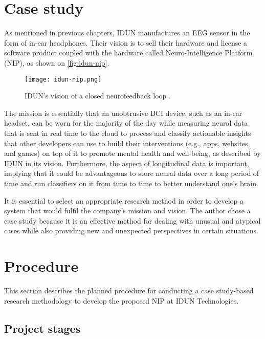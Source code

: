 \section{Case study}
\label{chapter3-case-study}

As mentioned in previous chapters, IDUN manufactures an EEG sensor in the form of in-ear headphones. Their vision is to sell their hardware and license a software product coupled with the hardware called Neuro-Intelligence Platform (NIP), as shown on \autoref{fig:idun-nip}.

\begin{figure}[!ht]
  \centering
  \texttt{[image: idun-nip.png]}
  \caption{IDUN's vision of a closed neurofeedback loop \citep{idun_guardian_nodate}.}
  \label{fig:idun-nip}
\end{figure}

The mission is essentially that an unobtrusive BCI device, such as an in-ear headset, can be worn for the majority of the day while measuring neural data that is sent in real time to the cloud to process and classify actionable insights that other developers can use to build their interventions (e.g., apps, websites, and games) on top of it to promote mental health and well-being, as described by IDUN in its vision. Furthermore, the aspect of longitudinal data is important, implying that it could be advantageous to store neural data over a long period of time and run classifiers on it from time to time to better understand one's brain.

It is essential to select an appropriate research method in order to develop a system that would fulfil the company's mission and vision. The author chose a case study because it is an effective method for dealing with unusual and atypical cases while also providing new and unexpected perspectives in certain situations.

\section{Procedure}
\label{chapter3-procedure}

This section describes the planned procedure for conducting a case study-based research methodology to develop the proposed NIP at IDUN Technologies.

\subsection{Project stages}
\label{chapter3-project-stages}

